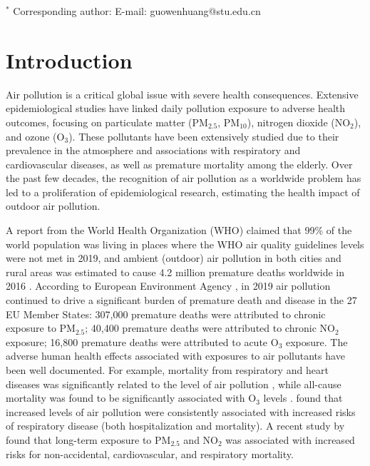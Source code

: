 \documentclass[
  12,
]{article}
\begin{document}
\(^*\) Corresponding author: E-mail: guowenhuang@stu.edu.cn

\hypertarget{introduction}{%
\section{Introduction}\label{introduction}}

Air pollution is a critical global issue with severe health
consequences. Extensive epidemiological studies have linked daily
pollution exposure to adverse health outcomes, focusing on particulate
matter (PM\(_{2.5}\), PM\(_{10}\)), nitrogen dioxide (NO\(_2\)), and
ozone (O\(_3\)). These pollutants have been extensively studied due to
their prevalence in the atmosphere and associations with respiratory and
cardiovascular diseases, as well as premature mortality among the
elderly. Over the past few decades, the recognition of air pollution as
a worldwide problem has led to a proliferation of epidemiological
research, estimating the health impact of outdoor air pollution.

A report from the World Health Organization (WHO) claimed that 99\% of
the world population was living in places where the WHO air quality
guidelines levels were not met in 2019, and ambient (outdoor) air
pollution in both cities and rural areas was estimated to cause 4.2
million premature deaths worldwide in 2016 \autocite{WHO2021}. According
to European Environment Agency \autocite{EEA2021}, in 2019 air pollution
continued to drive a significant burden of premature death and disease
in the 27 EU Member States: 307,000 premature deaths were attributed to
chronic exposure to PM\(_{2.5}\); 40,400 premature deaths were
attributed to chronic NO\(_2\) exposure; 16,800 premature deaths were
attributed to acute O\(_3\) exposure. The adverse human health effects
associated with exposures to air pollutants have been well documented.
For example, mortality from respiratory and heart diseases was
significantly related to the level of air pollution \autocites[see
e.g.,][]{Hoek2013,Hodgson1970}, while all-cause mortality was found to
be significantly associated with O\(_3\) levels \autocites[see
e.g.,][]{Huang2022,Anderson1996}. \textcite{Lee2020} found that
increased levels of air pollution were consistently associated with
increased risks of respiratory disease (both hospitalization and
mortality). A recent study by \textcite{Zhang2021} found that long-term
exposure to PM\(_{2.5}\) and NO\(_2\) was associated with increased
risks for non-accidental, cardiovascular, and respiratory mortality.
\end{document}
